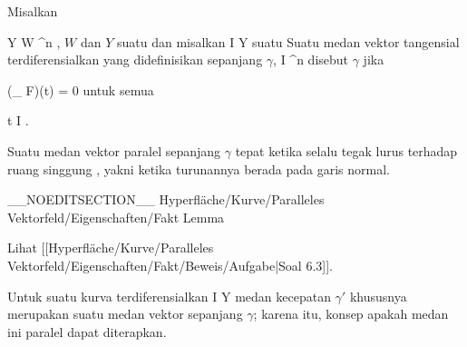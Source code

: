 
{}
{

Misalkan

\mavergleichskette
{\vergleichskette
{ Y
}
{ \subseteq }{ W
}
{ \subseteq }{ \R^n
}
{    }{
}
{   }{
}
}
{}{}{,}
$W$
dan $Y$ suatu
dan misalkan
\maabb {\gamma} { I } { Y
} {}
suatu
Suatu medan vektor tangensial terdiferensialkan yang didefinisikan sepanjang $\gamma$,
 { I } {\R^n
} {}
disebut
$\gamma$ jika

\mavergleichskettedisp
{\vergleichskette
{ (\nabla_{\gamma} F)(t)
}
{ =} { 0
}
{ } {
}
{ } {
}
{ } {
}
}
{}{}{}
untuk semua

\mavergleichskette
{\vergleichskette
{ t
}
{ \in }{ I
}
{  }{
}
{    }{
}
{   }{
}
}
{}{}{.}

}

Suatu medan vektor paralel sepanjang $\gamma$ tepat ketika
 selalu tegak lurus terhadap ruang singgung
, yakni ketika turunannya berada pada garis normal.

__NOEDITSECTION__
{Hyperfläche/Kurve/Paralleles Vektorfeld/Eigenschaften/Fakt}
{Lemma}
{}
{

\faktzusatz {}
\faktzusatz {}

 }
{ Lihat [[Hyperfläche/Kurve/Paralleles Vektorfeld/Eigenschaften/Fakt/Beweis/Aufgabe|Soal 6.3]]. }

Untuk suatu kurva terdiferensialkan
\maabbdisp {\gamma} { I } { Y
} {}
medan kecepatan $\gamma'$ khususnya merupakan suatu medan vektor sepanjang $\gamma$; karena itu, konsep apakah medan ini paralel dapat diterapkan.

